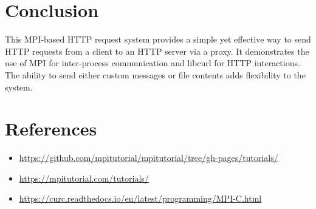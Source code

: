 \documentclass[a4paper,12pt]{article}
\begin{document}
\section{Conclusion}
This MPI-based HTTP request system provides a simple yet effective way to send HTTP requests from a client to an HTTP server via a proxy. It demonstrates the use of MPI for inter-process communication and libcurl for HTTP interactions. The ability to send either custom messages or file contents adds flexibility to the system.

\section{References}
\begin{itemize}
    \item \href{https://github.com/mpitutorial/mpitutorial/tree/gh-pages/tutorials/}{https://github.com/mpitutorial/mpitutorial/tree/gh-pages/tutorials/}
    \item \href{https://mpitutorial.com/tutorials/}{https://mpitutorial.com/tutorials/}
    \item \href{https://curc.readthedocs.io/en/latest/programming/MPI-C.html}{https://curc.readthedocs.io/en/latest/programming/MPI-C.html}
\end{itemize}
\end{document}
